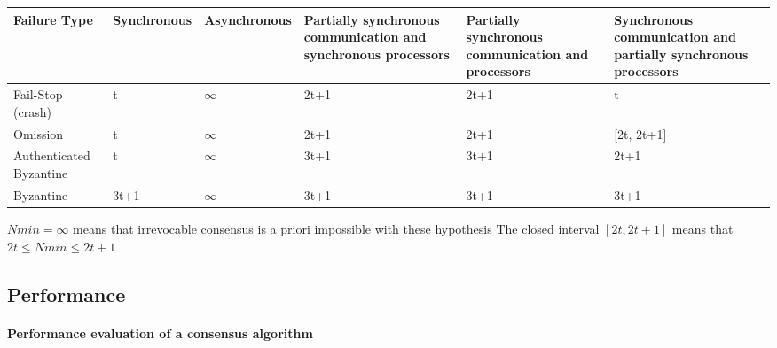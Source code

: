 \documentclass[11pt, twocolumn]{article}
\begin{document}
\begin{center}
    \begin{tabular}{ |m{2.4cm}|m{2.4cm}|m{2.4cm}|m{2.4cm}|m{2.4cm}|m{2.4cm}| }
        \hline
        Failure Type            & Synchronous & Asynchronous & Partially synchronous communication and synchronous processors & Partially synchronous communication and processors & Synchronous communication and partially synchronous processors \\
        \hline\hline
        Fail-Stop (crash)       & t           & \( \infty \) & 2t+1                                                           & 2t+1                                               & t                                                              \\
        \hline
        Omission                & t           & \( \infty \) & 2t+1                                                           & 2t+1                                               & [2t, 2t+1]                                                     \\
        \hline
        Authenticated Byzantine & t           & \( \infty \) & 3t+1                                                           & 3t+1                                               & 2t+1                                                           \\
        \hline
        Byzantine               & 3t+1        & \( \infty \) & 3t+1                                                           & 3t+1                                               & 3t+1                                                           \\
        \hline
    \end{tabular}
\end{center}


\(Nmin = \infty\) means that irrevocable consensus is a priori impossible with these hypothesis \cite{fischerlp}
The closed interval \([2t, 2t+1]\) means that  \(2t \leqslant Nmin \leqslant 2t+1\)

\subsection{Performance}

\paragraph{Performance evaluation of a consensus algorithm}
\end{document}
